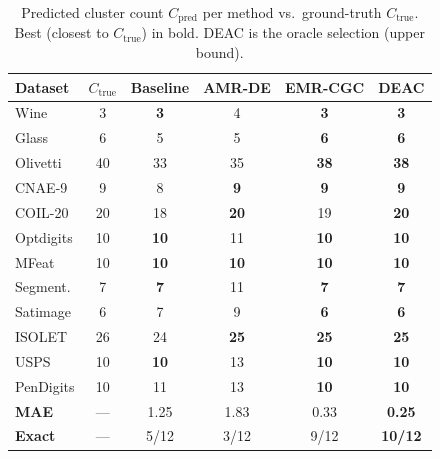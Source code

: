 \begin{table}[!t]
\centering
\caption{Predicted cluster count $C_{\text{pred}}$ per method vs.\ ground-truth $C_{\text{true}}$. Best (closest to $C_{\text{true}}$) in bold. DEAC is the oracle selection (upper bound).}
\label{tab:ccount}
\footnotesize
\setlength{\tabcolsep}{3pt}
\begin{tabular}{lccccc}
\toprule
Dataset & $C_{\text{true}}$ & Baseline & AMR-DE & EMR-CGC & \textbf{DEAC} \\
\midrule
Wine         & 3 & \textbf{3} & 4 & \textbf{3} & \textbf{3} \\
Glass        & 6 & 5 & 5 & \textbf{6} & \textbf{6} \\
Olivetti     & 40 & 33 & 35 & \textbf{38} & \textbf{38} \\
CNAE-9       & 9 & 8 & \textbf{9} & \textbf{9} & \textbf{9} \\
COIL-20      & 20 & 18 & \textbf{20} & 19 & \textbf{20} \\
Optdigits    & 10 & \textbf{10} & 11 & \textbf{10} & \textbf{10} \\
MFeat        & 10 & \textbf{10} & \textbf{10} & \textbf{10} & \textbf{10} \\
Segment.     & 7 & \textbf{7} & 11 & \textbf{7} & \textbf{7} \\
Satimage     & 6 & 7 & 9 & \textbf{6} & \textbf{6} \\
ISOLET       & 26 & 24 & \textbf{25} & \textbf{25} & \textbf{25} \\
USPS         & 10 & \textbf{10} & 13 & \textbf{10} & \textbf{10} \\
PenDigits    & 10 & 11 & 13 & \textbf{10} & \textbf{10} \\
\midrule
\textbf{MAE} & --- & 1.25 & 1.83 & 0.33 & \textbf{0.25} \\
\textbf{Exact} & --- & 5/12 & 3/12 & 9/12 & \textbf{10/12} \\
\bottomrule
\end{tabular}
\end{table}

